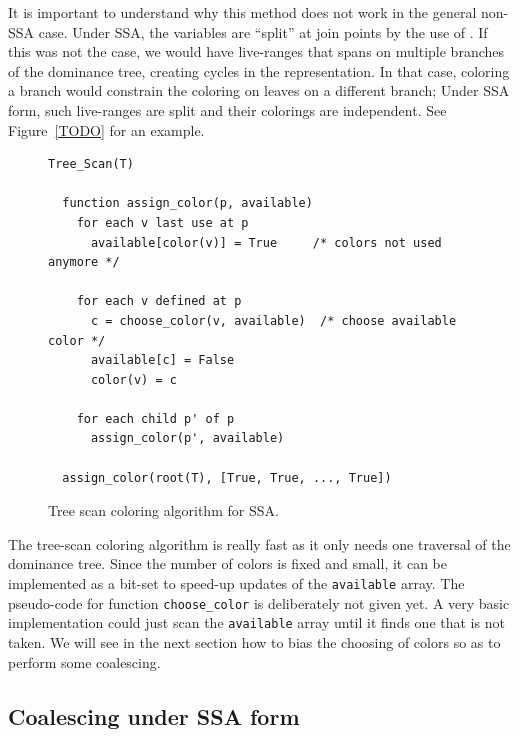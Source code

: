 {\begin{important}
It is important to understand why this method does not work in the general non-SSA case.
Under SSA, the variables are ``split'' at join points by the use of \phifuns.
If this was not the case, we would have live-ranges that spans on multiple branches of the dominance tree, creating cycles in the representation.
In that case, coloring a branch would constrain the coloring on leaves on a different branch; Under SSA form, such live-ranges are split and their colorings are independent.
See Figure~\ref{TODO} for an example.
\end{important}


\begin{figure}
  \begin{verbatim}
Tree_Scan(T)

  function assign_color(p, available)
    for each v last use at p
      available[color(v)] = True     /* colors not used anymore */

    for each v defined at p
      c = choose_color(v, available)  /* choose available color */
      available[c] = False
      color(v) = c

    for each child p' of p
      assign_color(p', available)

  assign_color(root(T), [True, True, ..., True])

  \end{verbatim}
  \caption{Tree scan coloring algorithm for SSA.}
  \label{code:assign-tree-scan}
\end{figure}


The tree-scan coloring algorithm is really fast as it only needs one traversal of the dominance tree. 
Since the number of colors is fixed and small, it can be implemented as a bit-set to speed-up updates of the {\tt available} array.
The pseudo-code for function {\tt choose\_color} is deliberately not given yet. 
A very basic implementation could just scan the {\tt available} array until it finds one that is not taken.
We will see in the next section how to bias the choosing of colors so as to perform some coalescing. 
 


\subsection{Coalescing under SSA form}

}
